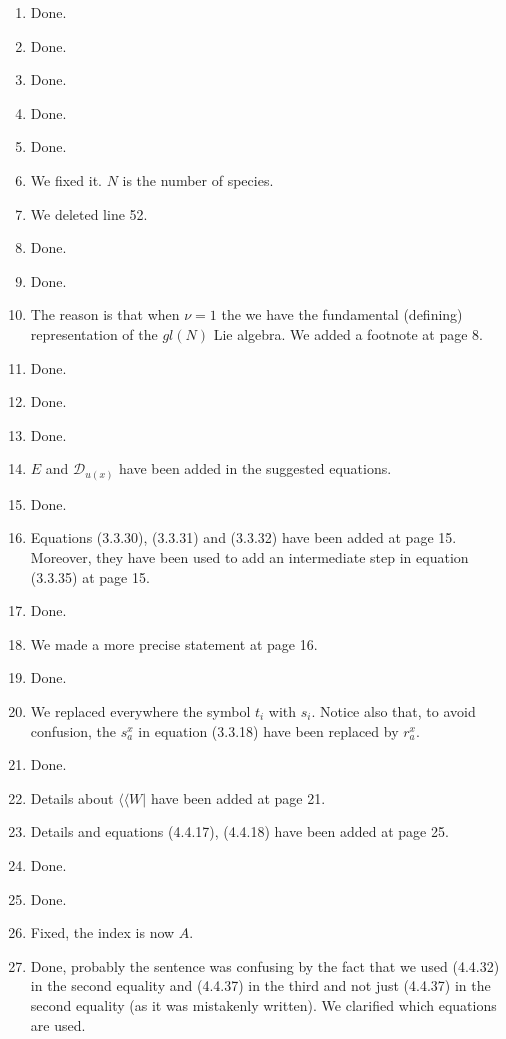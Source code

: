 \documentclass[10pt]{article}
\numberwithin{equation}{section}
\numberwithin{equation}{subsection}
\begin{document}
		\begin{enumerate}
			\item Done.
			\item Done.
			\item Done.
			\item Done.
			\item Done.
			\item We fixed it. $N$ is the number of species. 
			\item We deleted line 52.
			\item Done.
			\item Done.
			\item The reason is that when $\nu=1$ the we have the fundamental (defining) representation of the $gl(N)$ Lie algebra. We added a footnote at page 8. %
			\item Done.
			\item Done.
			\item Done.
			\item  $E$ and $\mathcal{D}_{u(x)}$ have been added in the suggested equations.
			\item Done.
			\item Equations (3.3.30), (3.3.31) and (3.3.32) have been added at page 15. Moreover, they have been used to add an intermediate step in equation (3.3.35) at page 15.
			\item Done.
			\item We made a more precise statement at page 16. 
			\item Done.
			\item We replaced everywhere the symbol $t_{i}$ with $s_{i}$. Notice also that, to avoid confusion, the $s_{a}^{x}$ in equation (3.3.18) have been replaced by $r_{a}^{x}$.
			\item Done. 
			\item Details about $\langle \langle W|$ have been added at page 21. 
			\item Details and equations (4.4.17), (4.4.18) have been added at page 25. 
			\item Done.
			\item Done.
			\item Fixed, the index is now $A$.
			\item Done, probably the sentence was confusing by the fact that we used (4.4.32) in the second equality and (4.4.37) in the third and not just (4.4.37) in the second equality (as it was mistakenly written). We clarified which equations are used. 

\end{enumerate}
\end{document}
